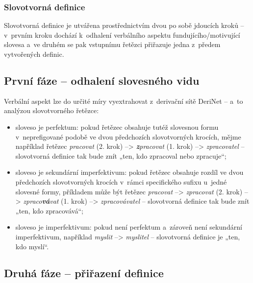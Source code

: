 \hypertarget{slovotvornuxe1-definice}{%
\subsubsection{Slovotvorná definice}\label{slovotvornuxe1-definice}}

Slovotvorná definice je utvářena prostřednictvím dvou po sobě jdoucích
kroků -- v~prvním kroku dochází k~odhalení verbálního aspektu
fundujícího/motivující slovesa a~ve druhém se pak vstupnímu řetězci
přiřazuje jedna z~předem vytvořených definic.

\hypertarget{prvni-faze}{%
\subsection*{První fáze -- odhalení slovesného vidu}\label{prvni-faze}}

Verbální aspekt lze do určité míry vyextrahovat z~derivační sítě DeriNet
-- a~to analýzou slovotvorného řetězce:

\begin{itemize}
\tightlist
\item
  sloveso je perfektum: pokud řetězec obsahuje tutéž slovesnou formu
v~neprefigované podobě ve dvou předchozích slovotvorných krocích, mějme
  například řetězec \emph{pracovat} (2. krok) --\textgreater{}
  \emph{\textbf{z}pracovat} (1. krok) --\textgreater{}
  \emph{zpracovatel} -- slovotvorná definice tak bude znít „ten, kdo
  zpracoval nebo zpracuje``;
\item
  sloveso je sekundární imperfektivum: pokud řetězec obsahuje rozdíl ve
  dvou předchozích slovotvorných krocích v~rámci specifického sufixu
u~jedné slovesné formy, příkladem může být řetězec \emph{pracovat}
  --\textgreater{} \emph{zpracovat} (2. krok) --\textgreater{}
  \emph{zpraco\textbf{vá}vat} (1. krok) --\textgreater{}
  \emph{zpracovávatel} -- slovotvorná definice tak bude znít „ten, kdo
  zpracovává``;
\item
  sloveso je imperfektivum: pokud není perfektum a~zároveň není
  sekundární imperfektivum, například \emph{myslit} --\textgreater{}
  \emph{myslitel} -- slovotvorná definice je „ten, kdo myslí``.
 ~\parencite{adri}
\end{itemize}

\hypertarget{druha-faze}{%
\subsection*{Druhá fáze -- přiřazení definice}\label{druha-faze}}

